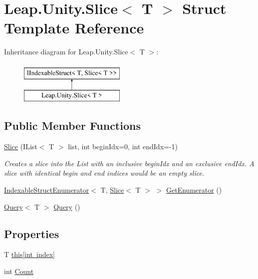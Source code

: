 \hypertarget{struct_leap_1_1_unity_1_1_slice}{}\section{Leap.\+Unity.\+Slice$<$ T $>$ Struct Template Reference}
\label{struct_leap_1_1_unity_1_1_slice}
Inheritance diagram for Leap.\+Unity.\+Slice$<$ T $>$\+:\begin{figure}[H]
\begin{center}
\leavevmode
\includegraphics[height=2.000000cm]{struct_leap_1_1_unity_1_1_slice}
\end{center}
\end{figure}
\subsection*{Public Member Functions}
\begin{DoxyCompactItemize}
\item 
\mbox{\hyperlink{struct_leap_1_1_unity_1_1_slice_a269ca2618c7a7d3bb7f92e6109442fbd}{Slice}} (I\+List$<$ T $>$ list, int begin\+Idx=0, int end\+Idx=-\/1)
\begin{DoxyCompactList}\small\item\em Creates a slice into the List with an inclusive begin\+Idx and an {\itshape exclusive} end\+Idx. A slice with identical begin and end indices would be an empty slice. \end{DoxyCompactList}\item 
\mbox{\hyperlink{struct_leap_1_1_unity_1_1_indexable_struct_enumerator}{Indexable\+Struct\+Enumerator}}$<$ T, \mbox{\hyperlink{struct_leap_1_1_unity_1_1_slice}{Slice}}$<$ T $>$ $>$ \mbox{\hyperlink{struct_leap_1_1_unity_1_1_slice_a19537a9776f32b8ea888b96bfaa7f8e7}{Get\+Enumerator}} ()
\item 
\mbox{\hyperlink{struct_leap_1_1_unity_1_1_query_1_1_query}{Query}}$<$ T $>$ \mbox{\hyperlink{struct_leap_1_1_unity_1_1_slice_af8014899e4741b106ae87871d0018ba1}{Query}} ()
\end{DoxyCompactItemize}
\subsection*{Properties}
\begin{DoxyCompactItemize}
\item 
T \mbox{\hyperlink{struct_leap_1_1_unity_1_1_slice_af8670392523e20ba513a6dcd8455cf1b}{this\mbox{[}int index\mbox{]}}}
\item 
int \mbox{\hyperlink{struct_leap_1_1_unity_1_1_slice_a781fdd1cd77c558054e6bfd1ef60444d}{Count}}
\end{DoxyCompactItemize}


